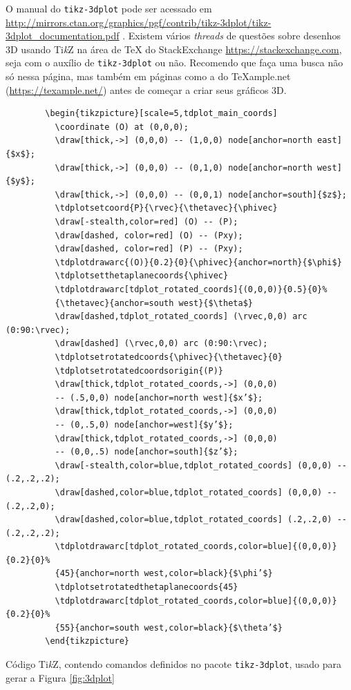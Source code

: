 \begin{itemize}
O manual do \texttt{tikz-3dplot} pode ser acessado em
\url{http://mirrors.ctan.org/graphics/pgf/contrib/tikz-3dplot/tikz-3dplot_documentation.pdf} \parencite{tikz-3dplot}. Existem vários \textit{threads} de questões sobre desenhos 3D usando Ti\textit{k}Z na área de \TeX{} do StackExchange \url{https://stackexchange.com}, seja com o auxílio de \texttt{tikz-3dplot} ou não. Recomendo que faça uma busca não só nessa página, mas também em páginas como a do \TeX{}ample.net (\url{https://texample.net/}) antes de começar a criar seus gráficos 3D.

\begin{listing}[H]
	\begin{verbatim}
		\begin{tikzpicture}[scale=5,tdplot_main_coords]
		  \coordinate (O) at (0,0,0);
		  \draw[thick,->] (0,0,0) -- (1,0,0) node[anchor=north east]{$x$};
		  \draw[thick,->] (0,0,0) -- (0,1,0) node[anchor=north west]{$y$};
		  \draw[thick,->] (0,0,0) -- (0,0,1) node[anchor=south]{$z$};
		  \tdplotsetcoord{P}{\rvec}{\thetavec}{\phivec}
		  \draw[-stealth,color=red] (O) -- (P);
		  \draw[dashed, color=red] (O) -- (Pxy);
		  \draw[dashed, color=red] (P) -- (Pxy);
		  \tdplotdrawarc{(O)}{0.2}{0}{\phivec}{anchor=north}{$\phi$}
		  \tdplotsetthetaplanecoords{\phivec}
		  \tdplotdrawarc[tdplot_rotated_coords]{(0,0,0)}{0.5}{0}%
		  {\thetavec}{anchor=south west}{$\theta$}
		  \draw[dashed,tdplot_rotated_coords] (\rvec,0,0) arc (0:90:\rvec);
		  \draw[dashed] (\rvec,0,0) arc (0:90:\rvec);
		  \tdplotsetrotatedcoords{\phivec}{\thetavec}{0}
		  \tdplotsetrotatedcoordsorigin{(P)}
		  \draw[thick,tdplot_rotated_coords,->] (0,0,0)
		  -- (.5,0,0) node[anchor=north west]{$x’$};
		  \draw[thick,tdplot_rotated_coords,->] (0,0,0)
		  -- (0,.5,0) node[anchor=west]{$y’$};
		  \draw[thick,tdplot_rotated_coords,->] (0,0,0)
		  -- (0,0,.5) node[anchor=south]{$z’$};
		  \draw[-stealth,color=blue,tdplot_rotated_coords] (0,0,0) --(.2,.2,.2);
		  \draw[dashed,color=blue,tdplot_rotated_coords] (0,0,0) -- (.2,.2,0);
		  \draw[dashed,color=blue,tdplot_rotated_coords] (.2,.2,0) --(.2,.2,.2);
		  \tdplotdrawarc[tdplot_rotated_coords,color=blue]{(0,0,0)}{0.2}{0}%
		  {45}{anchor=north west,color=black}{$\phi’$}
		  \tdplotsetrotatedthetaplanecoords{45}
		  \tdplotdrawarc[tdplot_rotated_coords,color=blue]{(0,0,0)}{0.2}{0}%
		  {55}{anchor=south west,color=black}{$\theta’$}
		\end{tikzpicture}
	\end{verbatim}
	\caption{Código Ti\textit{k}Z, contendo comandos definidos no pacote \texttt{tikz-3dplot}, usado para gerar a Figura \ref{fig:3dplot}}
	\label{cod:3dplot}
\end{listing}


\end{itemize}
